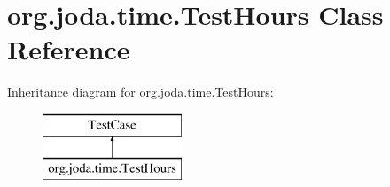 \hypertarget{classorg_1_1joda_1_1time_1_1_test_hours}{\section{org.\-joda.\-time.\-Test\-Hours Class Reference}
\label{classorg_1_1joda_1_1time_1_1_test_hours}
}
Inheritance diagram for org.\-joda.\-time.\-Test\-Hours\-:\begin{figure}[H]
\begin{center}
\leavevmode
\includegraphics[height=2.000000cm]{classorg_1_1joda_1_1time_1_1_test_hours}
\end{center}
\end{figure}
